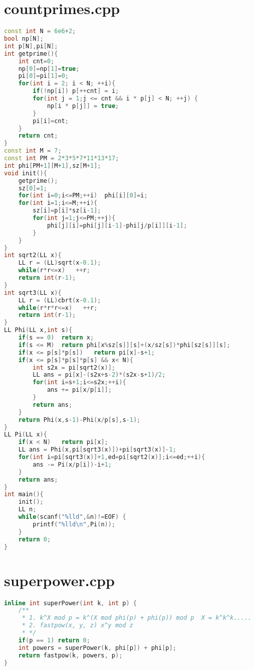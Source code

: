 \section{countprimes.cpp}
\begin{lstlisting}[language=c++]
const int N = 6e6+2;
bool np[N];
int p[N],pi[N];
int getprime(){
    int cnt=0;
    np[0]=np[1]=true;
    pi[0]=pi[1]=0;
    for(int i = 2; i < N; ++i){
        if(!np[i]) p[++cnt] = i;
        for(int j = 1;j <= cnt && i * p[j] < N; ++j) {
            np[i * p[j]] = true;
        }
        pi[i]=cnt;
    }
    return cnt;
}
const int M = 7;
const int PM = 2*3*5*7*11*13*17;
int phi[PM+1][M+1],sz[M+1];
void init(){
    getprime();
    sz[0]=1;
    for(int i=0;i<=PM;++i)  phi[i][0]=i;
    for(int i=1;i<=M;++i){
        sz[i]=p[i]*sz[i-1];
        for(int j=1;j<=PM;++j){
            phi[j][i]=phi[j][i-1]-phi[j/p[i]][i-1];
        }
    }
}
int sqrt2(LL x){
    LL r = (LL)sqrt(x-0.1);
    while(r*r<=x)   ++r;
    return int(r-1);
}
int sqrt3(LL x){
    LL r = (LL)cbrt(x-0.1);
    while(r*r*r<=x)   ++r;
    return int(r-1);
}
LL Phi(LL x,int s){
    if(s == 0)  return x;
    if(s <= M)  return phi[x%sz[s]][s]+(x/sz[s])*phi[sz[s]][s];
    if(x <= p[s]*p[s])   return pi[x]-s+1;
    if(x <= p[s]*p[s]*p[s] && x< N){
        int s2x = pi[sqrt2(x)];
        LL ans = pi[x]-(s2x+s-2)*(s2x-s+1)/2;
        for(int i=s+1;i<=s2x;++i){
            ans += pi[x/p[i]];
        }
        return ans;
    }
    return Phi(x,s-1)-Phi(x/p[s],s-1);
}
LL Pi(LL x){
    if(x < N)   return pi[x];
    LL ans = Phi(x,pi[sqrt3(x)])+pi[sqrt3(x)]-1;
    for(int i=pi[sqrt3(x)]+1,ed=pi[sqrt2(x)];i<=ed;++i){
        ans -= Pi(x/p[i])-i+1;
    }
    return ans;
}
int main(){
    init();
    LL n;
    while(scanf("%lld",&n)!=EOF) {
        printf("%lld\n",Pi(n));
    }
    return 0;
}


\end{lstlisting}
\section{superpower.cpp}
\begin{lstlisting}[language=c++]
inline int superPower(int k, int p) {
	/**
	 * 1. k^X mod p = k^(X mod phi(p) + phi(p)) mod p  X = k^k^k.....
	 * 2. fastpow(x, y, z) x^y mod z
	 * */
	if(p == 1) return 0;
	int powers = superPower(k, phi[p]) + phi[p];
	return fastpow(k, powers, p);
}


\end{lstlisting}

